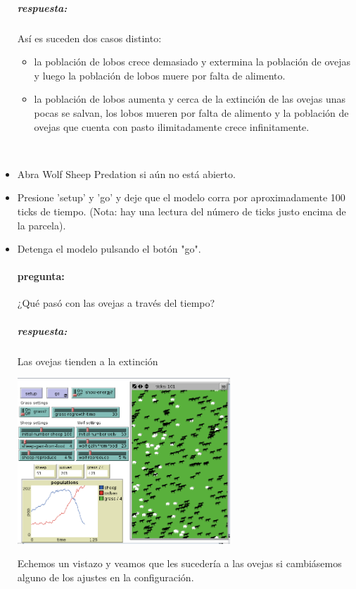 \documentclass[12pt,letterpaper]{article}
\begin{document}
\begin{itemize}
	\subparagraph{respuesta:}
		Así es suceden dos casos distinto:
		\begin{itemize}
			\item la población de lobos crece demasiado y extermina la población de ovejas y luego la población de lobos muere por falta de alimento.
		
			\item la población de lobos aumenta y cerca de la extinción de las ovejas unas pocas se salvan, los lobos mueren por falta de alimento y la población de ovejas que cuenta con pasto ilimitadamente crece infinitamente.
		\end{itemize}
	
	\hfill \\
		
	\item Abra Wolf Sheep Predation si aún no está abierto.
	
	\item Presione 'setup' y 'go' y deje que el modelo corra por aproximadamente 100 ticks de tiempo. (Nota: hay una lectura del número de ticks justo encima de la parcela).
	
	\item Detenga el modelo pulsando el botón "go".

		\paragraph{pregunta:}
			¿Qué pasó con las ovejas a través del tiempo?
			
		\subparagraph{respuesta:}
			Las ovejas tienden a la extinción
			
			\begin{center}
				\includegraphics[width=8cm]{./imagenes/image5.png}
			\end{center}
			
		
	Echemos un vistazo y veamos que les sucedería a las ovejas si cambiásemos alguno de los ajustes en la configuración.
	\hfill \
	

\end{itemize}
\end{document}
